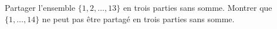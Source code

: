 Partager l'ensemble $\{1, 2, \ldots, 13\}$ en trois parties sans somme. Montrer que $\{1, \ldots, 14\}$ ne peut pas être partagé en trois parties sans somme.
